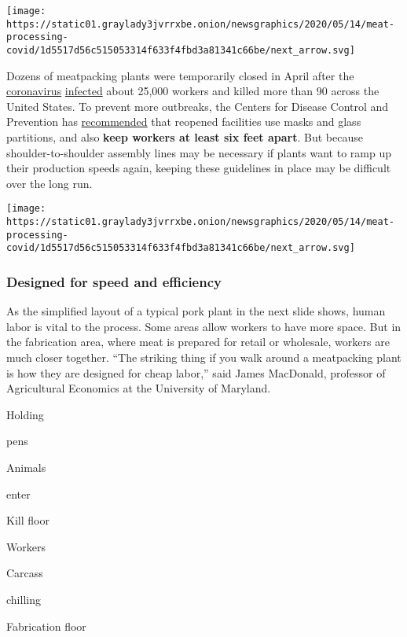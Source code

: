 \texttt{[image: https://static01.graylady3jvrrxbe.onion/newsgraphics/2020/05/14/meat-processing-covid/1d5517d56c515053314f633f4fbd3a81341c66be/next\_arrow.svg]}

Dozens of meatpacking plants were temporarily closed in April after the
\href{https://www.nytimes3xbfgragh.onion/2020/04/15/us/coronavirus-south-dakota-meat-plant-refugees.html?searchResultPosition=3}{coronavirus}
\href{https://thefern.org/2020/04/mapping-covid-19-in-meat-and-food-processing-plants/}{infected}
about 25,000 workers and killed more than 90 across the United States.
To prevent more outbreaks, the Centers for Disease Control and
Prevention has
\href{https://www.cdc.gov/coronavirus/2019-ncov/community/organizations/meat-poultry-processing-workers-employers.html}{recommended}
that reopened facilities use masks and glass partitions, and also
\textbf{keep workers at least six feet apart}. But because
shoulder-to-shoulder assembly lines may be necessary if plants want to
ramp up their production speeds again, keeping these guidelines in place
may be difficult over the long run.

\texttt{[image: https://static01.graylady3jvrrxbe.onion/newsgraphics/2020/05/14/meat-processing-covid/1d5517d56c515053314f633f4fbd3a81341c66be/next\_arrow.svg]}

\hypertarget{designed-for-speed-and-efficiency}{%
\subsubsection{Designed for speed and
efficiency}\label{designed-for-speed-and-efficiency}}

As the simplified layout of a typical pork plant in the next slide
shows, human labor is vital to the process. Some areas allow workers to
have more space. But in the fabrication area, where meat is prepared for
retail or wholesale, workers are much closer together. ``The striking
thing if you walk around a meatpacking plant is how they are designed
for cheap labor,'' said James MacDonald, professor of Agricultural
Economics at the University of Maryland.

Holding

pens

Animals

enter

Kill floor

Workers

Carcass

chilling

Fabrication floor

